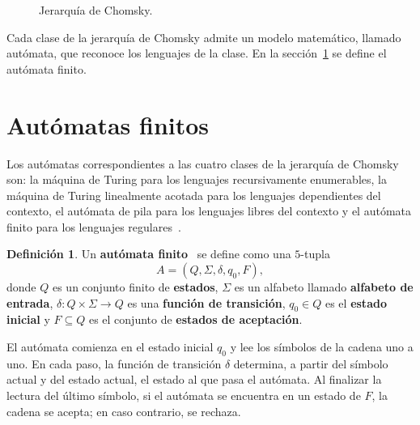 \documentclass{report}
\theoremstyle{definition}
\newtheorem{definicion}{Definición}[chapter]
\theoremstyle{plain}
\theoremstyle{remark}
\begin{document}
\begin{figure}[H]
\centering
{}
\caption{Jerarquía de Chomsky.}
\label{fig:chomsky}
\end{figure}

Cada clase de la jerarquía de Chomsky admite un modelo matemático,
llamado autómata, que reconoce los lenguajes de la clase. En la
sección~\ref{sec:automatas} se define el autómata finito.

\section{Autómatas finitos}
\label{sec:automatas}

Los autómatas correspondientes a las cuatro clases de la jerarquía de
Chomsky son: la máquina de Turing para los lenguajes recursivamente
enumerables, la máquina de Turing linealmente acotada para los
lenguajes dependientes del contexto, el autómata de pila para los
lenguajes libres del contexto y el autómata finito para los lenguajes
regulares~\cite{hopcroft2006introduction}.

\begin{definicion}
Un \textbf{autómata finito}~\cite{hopcroft2006introduction} se define
como una $5$-tupla
\[
  A = (Q, \Sigma, \delta, q_0, F),
\]
donde $Q$ es un conjunto finito de \textbf{estados}, $\Sigma$ es un
alfabeto llamado \textbf{alfabeto de entrada},
$\delta : Q \times \Sigma \to Q$ es una \textbf{función de transición},
$q_0 \in Q$ es el \textbf{estado inicial} y $F \subseteq Q$ es el
conjunto de \textbf{estados de aceptación}.
\end{definicion}

El autómata comienza en el estado inicial $q_0$ y lee los símbolos de la
cadena uno a uno. En cada paso, la función de transición $\delta$
determina, a partir del símbolo actual y del estado actual, el estado al
que pasa el autómata. Al finalizar la lectura del último símbolo, si el
autómata se encuentra en un estado de $F$, la cadena se acepta; en caso
contrario, se rechaza.
\end{document}
